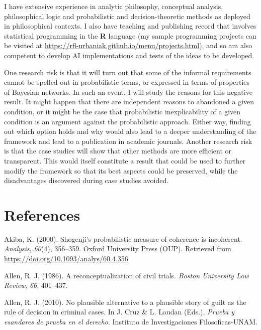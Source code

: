 \documentclass[11pt,dvipsnames,enabledeprecatedfontcommands]{scrartcl}
\begin{document}
I have extensive experience in analytic philosophy, conceptual analysis,
philosophical logic and probabilistic and decision-theoretic methods as
deployed in philosophical contexts. I also have teaching and publishing
record that involves statistical programming in the \textsf{\textbf{R}}
language (my sample programming projects can be visited at
\url{https://rfl-urbaniak.github.io/menu/projects.html}), and so am also
competent to develop AI implementations and tests of the ideas to be
developed.

One research risk is that it will turn out that some of the informal
requirements cannot be spelled out in probabilistic terms, or expressed
in terms of properties of Bayesian networks. In such an event, I will
study the reasons for this negative result. It might happen that there
are independent reasons to abandoned a given condition, or it might be
the case that probabilistic inexplicability of a given condition is an
argument against the probabilistic approach. Either way, finding out
which option holds and why would also lead to a deeper understanding of
the framework and lead to a publication in academic journals. Another
research risk is that the case studies will show that other methods are
more efficient or transparent. This would itself constitute a result
that could be used to further modify the framework so that its best
aspects could be preserved, while the disadvantages discovered during
case studies avoided.

\section{References}\label{references}

\footnotesize 

\hypertarget{refs}{}
\hypertarget{ref-Akiba2000Shogenjis}{}
Akiba, K. (2000). Shogenji's probabilistic measure of coherence is
incoherent. \emph{Analysis}, \emph{60}(4), 356--359. Oxford University
Press (OUP). Retrieved from
\url{https://doi.org/10.1093/analys/60.4.356}

\hypertarget{ref-Allen1986A-Reconceptuali}{}
Allen, R. J. (1986). A reconceptualization of civil trials. \emph{Boston
University Law Review}, \emph{66}, 401--437.

\hypertarget{ref-Allen2010No-Plausible-Al}{}
Allen, R. J. (2010). No plausible alternative to a plausible story of
guilt as the rule of decision in criminal cases. In J. Cruz \& L. Laudan
(Eds.), \emph{Prueba y esandares de prueba en el derecho}. Instituto de
Investigaciones Filosoficas-UNAM.
\end{document}
